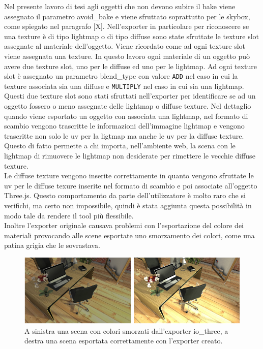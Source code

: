 Nel presente lavoro di tesi agli oggetti che non devono subire il bake viene assegnato il parametro avoid\_bake e viene sfruttato soprattutto per le skybox, come spiegato nel paragrafo [X].
Nell’exporter in particolare per riconoscere se una texture è di tipo lightmap o di tipo diffuse sono state sfruttate le texture slot assegnate al materiale dell’oggetto. 
Viene ricordato come ad ogni texture slot viene assegnata una texture. In questo lavoro ogni materiale di un oggetto può avere due texture slot, uno per le diffuse ed uno per le lightmap.
Ad ogni texture slot è assegnato un parametro blend\_type con valore \texttt{ADD} nel caso in cui la texture associata sia una diffuse e \texttt{MULTIPLY} nel caso in cui sia una lightmap.
\\
Questi due texture slot sono stati sfruttati nell’exporter per identificare se ad un oggetto fossero o meno assegnate delle lightmap o diffuse texture.
Nel dettaglio quando viene esportato un oggetto con associata una lightmap, nel formato di scambio vengono trascritte le informazioni dell’immagine lightmap e vengono trascritte non solo le uv per la ligtmap ma anche le uv per la diffuse texture.
Questo di fatto permette a chi importa, nell’ambiente web, la scena con le lightmap di rimuovere le lightmap non desiderate per rimettere le vecchie diffuse texture.
\\ 
Le diffuse texture vengono inserite correttamente in quanto vengono sfruttate le uv per le diffuse texure inserite nel formato di scambio e poi associate all’oggetto Three.js.
Questo comportamento da parte dell’utilizzatore è molto raro che si verifichi, ma certo non impossibile, quindi è stata aggiunta questa possibilità in modo tale da rendere il tool più flessibile.
\\
Inoltre l’exporter originale causava problemi con l’esportazione del colore dei materiali provocando alle scene esportate uno smorzamento dei colori, come una patina grigia che le sovrastava.
\\
\begin{figure}[htb]
 \centering
 \includegraphics[width=1\linewidth]{images/chapter_baking_service/grigio_chiaro.png}\hfill
 \caption[Miglioramenti nell'esportazione dei colori.]{A sinistra una scena con colori smorzati dall'exporter io\_three, a destra una scena esportata correttamente con l'exporter creato.}
 \label{fig:baking_service_grigio_chiaro}
\end{figure}
